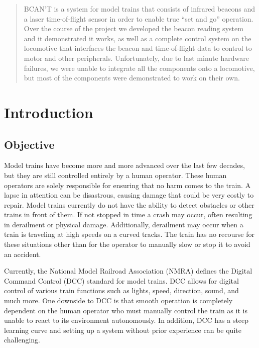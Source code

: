 \documentclass[openbib,letterpaper,10pt]{article}
\newcommand{\abstractsetting}{
	\pagenumbering{roman}
	\thispagestyle{fancy}
}
\newcommand{\buildtoc}{
	\clearpage
	\singlespacing
	\tableofcontents
	\clearpage
	\onehalfspacing
	\setcounter{page}{1}
	\pagenumbering{arabic}
}
\begin{document}
\maketitle
\pagestyle{fancy}
\begin{spacing}{1.15}

\begin{abstract}
BCAN'T is a system for model trains that consists of infrared beacons and a laser time-of-flight sensor in order to enable true “set and go” operation. Over the course of the project we developed the beacon reading system and it demonstrated it works, as well as a complete control system on the locomotive that interfaces the beacon and time-of-flight data to control to motor and other peripherals. Unfortunately, due to last minute hardware failures, we were unable to integrate all the components onto a locomotive, but most of the components were demonstrated to work on their own.
\abstractsetting %
\end{abstract}

\buildtoc


\section{Introduction}
\subsection{Objective}
Model trains have become more and more advanced over the last few decades, but they are still controlled entirely by a human operator. These human operators are solely responsible for ensuring that no harm comes to the train. A lapse in attention can be disastrous, causing damage that could be very costly to repair. Model trains currently do not have the ability to detect obstacles or other trains in front of them. If not stopped in time a crash may occur, often resulting in derailment or physical damage. Additionally, derailment may occur when a train is traveling at high speeds on a curved tracks. The train has no recourse for these situations other than for the operator to manually slow or stop it to avoid an accident.\par

Currently, the National Model Railroad Association (NMRA) defines the Digital Command Control (DCC) standard for model trains. DCC allows for digital control of various train functions such as lights, speed, direction, sound, and much more\cite{NMRA_DCC}. One downside to DCC is that smooth operation is completely dependent on the human operator who must manually control the train as it is unable to react to its environment autonomously. In addition, DCC has a steep learning curve and setting up a system without prior experience can be quite challenging.\par


\end{spacing}
\end{document}
